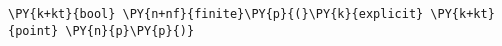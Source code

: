 \begin{Verbatim}[commandchars=\\\{\}]
    \PY{k+kt}{bool} \PY{n+nf}{finite}\PY{p}{(}\PY{k}{explicit} \PY{k+kt}{point} \PY{n}{p}\PY{p}{)}
\end{Verbatim}
